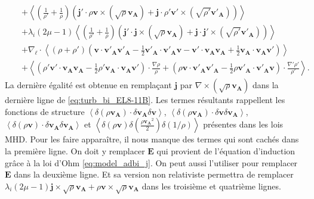 \begin{eqnarray}
        &&+ \left<\left(\frac{1}{\rho'}+ \frac{1}{\rho}\right)\left(  \boldsymbol{j'} \cdot   \rho\boldsymbol{v}  \times \left( \sqrt{\rho}\boldsymbol{v_A}\right) 
        +  \boldsymbol{j} \cdot \rho' \boldsymbol{v'}\times \left( \sqrt{\rho'}\boldsymbol{v'_A}\right)
        \right)\right> \nonumber\\
        &&+ \lambda_i\left(2\mu-1\right) \left<\left(\frac{1}{\rho'}+ \frac{1}{\rho}\right)\left( \boldsymbol{j'} \cdot \boldsymbol{j} \times \left( \sqrt{\rho}\boldsymbol{v_A}\right) + \boldsymbol{j} \cdot  \boldsymbol{j'} \times \left( \sqrt{\rho'}\boldsymbol{v'_A}\right)\right)\right> \nonumber\\
&&+\nabla_{\boldsymbol{\ell}} \cdot  \left<( \rho + \rho' )( \boldsymbol{v} \cdot  \boldsymbol{v'_A}  \boldsymbol{v'_A} - \frac{1}{2} \boldsymbol{v'_A} \cdot \boldsymbol{v'_A} \boldsymbol{v} - \boldsymbol{v'} \cdot  \boldsymbol{v_A}  \boldsymbol{v_A} + \frac{1}{2} \boldsymbol{v_A} \cdot \boldsymbol{v_A} \boldsymbol{v'})\right> \nonumber\\%
         &&+ \left<( \rho'  \boldsymbol{v'} \cdot  \boldsymbol{v_A}  \boldsymbol{v_A} - \frac{1}{2}\rho' \boldsymbol{v_A} \cdot \boldsymbol{v_A} \boldsymbol{v'})\cdot  \frac{\nabla\rho}{\rho} 
         +(  \rho \boldsymbol{v} \cdot  \boldsymbol{v'_A}  \boldsymbol{v'_A} - \frac{1}{2} \rho \boldsymbol{v'_A} \cdot \boldsymbol{v'_A} \boldsymbol{v})\cdot \frac{\nabla'\rho'}{\rho'}     \right> .
\end{eqnarray}
La dernière égalité est obtenue en remplaçant $\boldsymbol{j}$ par $\nabla \times \left( \sqrt{\rho}\boldsymbol{v_A}\right)$ dans la dernière ligne de \eqref{eq:turb_bi_EL8-11B}. Les termes résultants rappellent les fonctions de structure $\left<\delta (\rho \boldsymbol{v_A})\cdot  \delta \boldsymbol{v_A} \delta \boldsymbol{v}\right>$, $\left<\delta (\rho \boldsymbol{v_A})\cdot  \delta \boldsymbol{v} \delta \boldsymbol{v_A}\right>$, $\left<\delta (\rho \boldsymbol{v})\cdot  \delta \boldsymbol{v_A} \delta \boldsymbol{v_A}\right>$ et $\left<\delta (\rho \boldsymbol{v}) \delta  (\frac{\rho \boldsymbol{v_A}^2}{2}) \delta (1/\rho) \right>$ présentes dans les lois \ac{MHD}. Pour les faire apparaître, il nous manque des termes qui sont cachés dans la première ligne. On doit y remplacer $\boldsymbol{E}$ qui provient de l'équation d'induction grâce à la loi d'Ohm \eqref{eq:model_adbi_j}. On peut aussi l'utiliser pour remplacer $\boldsymbol{E}$ dans la deuxième ligne. Et sa version non relativiste permettra de remplacer $\lambda_i (2\mu-1)  \boldsymbol{j} \times\sqrt{\rho}\boldsymbol{v_A} + \rho \boldsymbol{v}  \times \sqrt{\rho}\boldsymbol{v_A} $ dans les troisième et quatrième lignes. 

